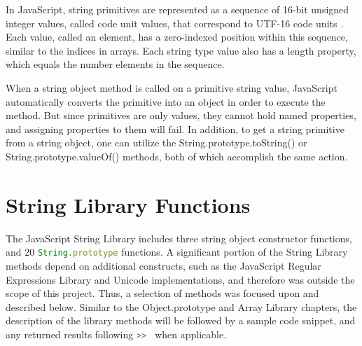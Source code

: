 \documentclass[a4paper,11pt,twoside]{report}
\def\jsinline{\lstinline[language=JavaScript, basicstyle=\small]}%\end{lstlisting}
\begin{document}
In JavaScript, string primitives are represented as a sequence of 16-bit unsigned integer values, called code unit values, that correspond to UTF-16 code units \cite{EcmaScript}. Each value, called an element, has a zero-indexed position within this sequence, similar to the indices in arrays. Each string type value also has a length property, which equals the number elements in the sequence.

When a string object method is called on a primitive string value, JavaScript automatically converts the primitive into an object in order to execute the method. But since primitives are only values, they cannot hold named properties, and assigning properties to them will fail. In addition, to get a string primitive from a string object, one can utilize the String.prototype.toString() or String.prototype.valueOf() methods, both of which accomplish the same action.

\section{String Library Functions}\label{sec:stringmethods}
The JavaScript String Library includes three string object constructor functions, and 20 \jsinline|String.prototype| functions. A significant portion of the String Library methods depend on additional constructs, such as the JavaScript Regular Expressions Library and Unicode implementations, and therefore was outside the scope of this project. Thus, a selection of methods was focused upon and described below. Similar to the Object.prototype and Array Library chapters, the description of the library methods will be followed by a sample code snippet, and any returned results following \jsinline|>> | when applicable.
\end{document}
